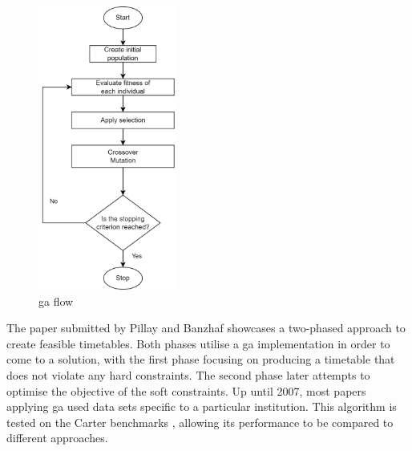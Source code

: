 \begin{figure}[H]
	\centering
	\includegraphics[width=0.40\textwidth]{images/related_works/GA/GA.png} 
	\caption{\acrlong{ga} flow}
	\label{fig:GA}
\end{figure}

The paper submitted by Pillay and Banzhaf \cite{pillay2010} showcases a two-phased approach to create feasible timetables. Both phases utilise a \acrshort{ga} implementation in order to come to a solution, with the first phase focusing on producing a timetable that does not violate any hard constraints. The second phase later attempts to optimise the objective of the soft constraints. Up until 2007, most papers applying \acrshort{ga} used data sets specific to a particular institution. This algorithm is tested on the Carter benchmarks \cite{carter1996}, allowing its performance to be compared to different approaches.

